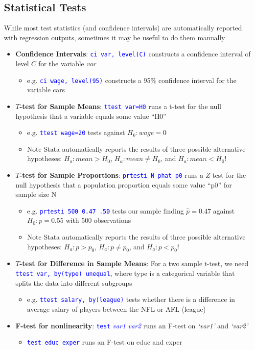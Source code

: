 \documentclass{article}
\begin{document}
\subsection{Statistical Tests}
While most test statistics (and confidence intervals) are automatically reported with regression outputs, sometimes it may be useful to do them manually
	\begin{itemize}
		\item \textbf{Confidence Intervals}: \textcolor{blue}{\texttt{ci var, level(C)}} constructs a confidence interval of level $C$ for the variable \emph{var}
		\begin{itemize}
			\item e.g. \textcolor{blue}{\texttt{ci wage, level(95)}} constructs a 95\% confidence interval for the variable cars
		\end{itemize} 
		\item \textbf{$T$-test for Sample Means}: \textcolor{blue}{\texttt{ttest var=H0}} runs a t-test for the null hypothesis that a variable equals some value ``H0'' 
		\begin{itemize}
			\item e.g. \textcolor{blue}{\texttt{ttest wage=20}} tests against $H_0: wage=0$
			\item Note Stata automatically reports the results of three possible alternative hypotheses: $H_a: mean>H_0$, $H_a:mean \neq H_0$, and $H_a: mean <H_0$! 
		\end{itemize} 
		\item \textbf{$T$-test for Sample Proportions}: \textcolor{blue}{\texttt{prtesti N phat p0}} runs a $Z$-test for the null hypothesis that a population proportion equals some value ``p0'' for sample size N
		\begin{itemize}
			\item e.g. \textcolor{blue}{\texttt{prtesti 500 0.47 .50}} tests our sample finding $\hat{p}=0.47$ against $H_0: p=0.55$ with 500 observations
			\item Note Stata automatically reports the results of three possible alternative hypotheses: $H_a: p>p_0$, $H_a:p \neq p_0$, and $H_a: p <p_0$! 
		\end{itemize} 
		\item\textbf{$T$-test for Difference in Sample Means}: For a two sample $t$-test, we need \textcolor{blue}{\texttt{ttest var, by(type) unequal}}, where type is a categorical variable that splits the data into different subgroups
		\begin{itemize}
			\item e.g. \textcolor{blue}{\texttt{ttest salary, by(league)}} tests whether there is a difference in average salary of players between the NFL or AFL  (league) 
		\end{itemize} 
		\item \textbf{F-test for nonlinearity}: \textcolor{blue}{\texttt{test} \emph{var1} \emph{var2}} runs an F-test on \emph{`var1'} and \emph{`var2'}
		\begin{itemize}
			\item \textcolor{blue}{\texttt{test educ exper}} runs an F-test on educ and exper
		\end{itemize}	
	\end{itemize}
\end{document}
